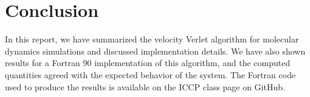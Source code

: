 \documentclass[10pt,a4paper]{article}
\begin{document}
\section{Conclusion}
In this report, we have summarized the velocity Verlet algorithm for molecular dynamics simulations and discussed implementation details. We have also shown results for a Fortran 90 implementation of this algorithm, and the computed quantities agreed with the expected behavior of the system. The Fortran code used to produce the results is available on the ICCP class page on GitHub.
\end{document}

